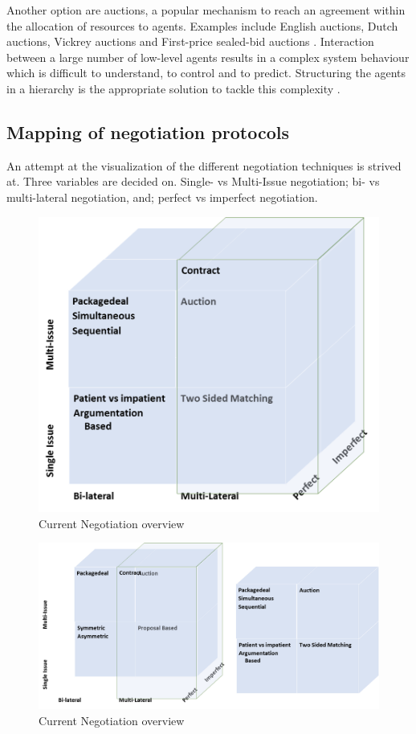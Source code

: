 Another option are auctions, a popular mechanism to reach an agreement within the allocation of resources to agents. Examples include English auctions, Dutch auctions, Vickrey auctions and First-price sealed-bid auctions \citep{wooldridge2009introduction}. Interaction between a large number of low-level agents results in a complex system behaviour which is difficult to understand, to control and to predict. Structuring the agents in a hierarchy is the appropriate solution to tackle this complexity \citep{van1998reference}.

\subsection{Mapping of negotiation protocols}
An attempt at the visualization of the different negotiation techniques is strived at. Three variables are decided on. Single- vs Multi-Issue negotiation; bi- vs multi-lateral negotiation, and; perfect vs imperfect negotiation.  
\begin{figure}[h]
	\centering
	\includegraphics[width=0.7\linewidth]{img/mapping_nego}
	\caption{Current Negotiation overview}
	\label{fig:mapping_nego}
\end{figure}


\begin{figure}[h]
	\centering
	\includegraphics[width=0.9\linewidth]{img/mapping_nego2}
	\caption{Current Negotiation overview}
	\label{fig:mapping_nego2}
\end{figure}

